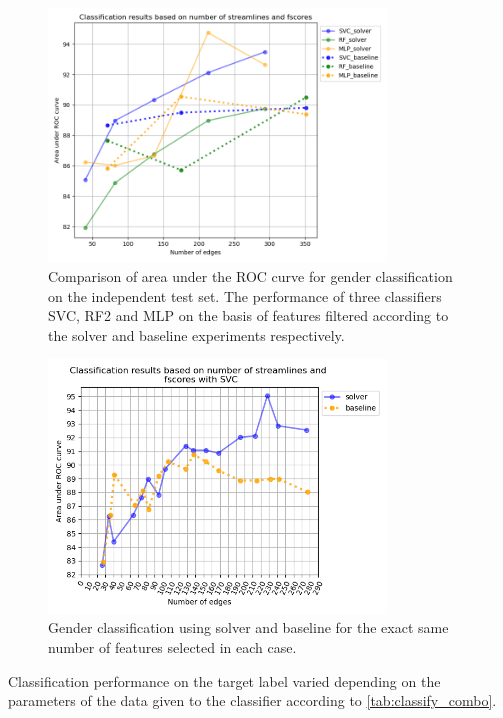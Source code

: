 \documentclass[msthesis.tex]{subfiles}
\begin{document}
\begin{figure}
    \centering
    \includegraphics[width=0.8\textwidth]{images/select_clf_auc_gender.png}
    \caption{Comparison of area under the ROC curve for gender classification on the independent test set. The performance of three classifiers \gls{SVC}, \gls{RF2} and \gls{MLP} on the basis of features filtered according to the solver and baseline experiments respectively.}
    \label{fig:clf_solver results}
\end{figure}

\begin{figure}
    \centering
    \includegraphics[width=0.8\textwidth]{images/select_clf_auf_gender_2_scaled.png}
    \caption{Gender classification using solver and baseline for the exact same number of features selected in each case.}
    \label{fig:svcgender}
\end{figure}
Classification performance on the target label varied depending on the parameters of the data given to the classifier according to \autoref{tab:classify_combo}.
\end{document}
